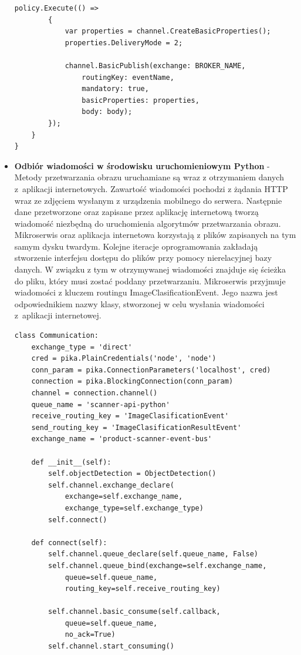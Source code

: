\begin{itemize}
\begin{lstlisting}[caption={Metoda publikacji wiadomości.}, label={messagePublish}]
		policy.Execute(() =>
		{
			var properties = channel.CreateBasicProperties();
			properties.DeliveryMode = 2;
	
			channel.BasicPublish(exchange: BROKER_NAME,
				routingKey: eventName,
				mandatory: true,
				basicProperties: properties,
				body: body);
		});
	}
}
\end{lstlisting}
\item \textbf{Odbiór wiadomości w środowisku uruchomieniowym Python} - Metody przetwarzania obrazu uruchamiane są wraz z otrzymaniem danych z~aplikacji internetowych. Zawartość wiadomości pochodzi z żądania HTTP wraz ze zdjęciem wysłanym z urządzenia mobilnego do serwera. Następnie dane przetworzone oraz zapisane przez aplikację internetową tworzą wiadomość niezbędną do uruchomienia algorytmów przetwarzania obrazu. Mikroserwis oraz aplikacja internetowa korzystają z plików zapisanych na tym samym dysku twardym. Kolejne iteracje oprogramowania zakładają stworzenie interfejsu dostępu do plików przy pomocy nierelacyjnej bazy danych. W związku z tym w otrzymywanej wiadomości znajduje się ścieżka do pliku, który musi zostać poddany przetwarzaniu. Mikroserwis przyjmuje wiadomości z kluczem routingu ImageClasificationEvent. Jego nazwa jest odpowiednikiem nazwy klasy, stworzonej w celu wysłania wiadomości z~aplikacji internetowej. 

\begin{lstlisting}[caption={Połączenie do kolejki RabbitMQ.}]
class Communication:
	exchange_type = 'direct'
	cred = pika.PlainCredentials('node', 'node')
	conn_param = pika.ConnectionParameters('localhost', cred)
	connection = pika.BlockingConnection(conn_param)
	channel = connection.channel()
	queue_name = 'scanner-api-python'
	receive_routing_key = 'ImageClasificationEvent'
	send_routing_key = 'ImageClasificationResultEvent'
	exchange_name = 'product-scanner-event-bus'
	
	def __init__(self):
		self.objectDetection = ObjectDetection()
		self.channel.exchange_declare(
			exchange=self.exchange_name,
			exchange_type=self.exchange_type)
		self.connect()
	
	def connect(self):
		self.channel.queue_declare(self.queue_name, False)
		self.channel.queue_bind(exchange=self.exchange_name,
			queue=self.queue_name,
			routing_key=self.receive_routing_key)
		
		self.channel.basic_consume(self.callback,
			queue=self.queue_name,
			no_ack=True)
		self.channel.start_consuming()
\end{lstlisting}


\end{itemize}
